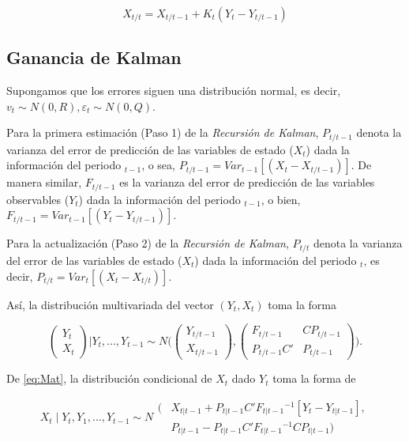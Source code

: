 \documentclass[
]{book}
\begin{document}
\begin{equation}
X_{t/t} = X_{t/t-1} + K_t (Y_t - Y_{t/t-1})
\label{eq:Xt1}
\end{equation}

\hypertarget{ganancia-de-kalman}{%
\subsection{Ganancia de Kalman}\label{ganancia-de-kalman}}

Supongamos que los errores siguen una distribución normal, es decir, \(v_t \sim N(0,R), \varepsilon_t \sim N(0,Q)\).

Para la primera estimación (Paso 1) de la \emph{Recursión de Kalman}, \(P_{t/t-1}\) denota la varianza del error de predicción de las variables de estado (\(X_t\)) dada la información del periodo \(_{t-1}\), o sea, \(P_{t/t-1} = Var_{t-1}[(X_t - X_{t/t-1})]\). De manera similar, \(F_{t/t-1}\) es la varianza del error de predicción de las variables observables (\(Y_t\)) dada la información del periodo \(_{t-1}\), o bien, \(F_{t/t-1} = Var_{t-1}[(Y_t - Y_{t/t-1})]\).

Para la actualización (Paso 2) de la \emph{Recursión de Kalman}, \(P_{t/t}\) denota la varianza del error de las variables de estado (\(X_t\)) dada la información del periodo \(_t\), es decir, \(P_{t/t} = Var_t[(X_t - X_{t/t})]\).

Así, la distribución multivariada del vector \((Y_t,X_t)\) toma la forma

\begin{equation}
\begin{pmatrix}
Y_t \\ X_t
\end{pmatrix}
\Bigg|
Y_t,...,Y_{t-1} \sim N
\Bigg(\begin{pmatrix}
Y_{t/t-1} \\ X_{t/t-1}
\end{pmatrix},
\begin{pmatrix}
F_{t/t-1} & C P_{t/t-1} \\
P_{t/t-1} C' & P_{t/t-1}
\end{pmatrix}\Bigg).
\label{eq:Mat}
\end{equation}

De \eqref{eq:Mat}, la distribución condicional de \(X_t\) dado \(Y_t\) toma la forma de

\begin{equation}
X_t \mid Y_t, Y_1, ... , Y_{t-1} \sim N
\begin{aligned}
( & X_{t|t-1} + P_{t|t-1} C' F_{t|t-1} {}^{-1} [Y_t - Y_{t|t-1}], \\ 
& P_{t|t-1} - P_{t|t-1} C' F_{t|t-1} {}^{-1} C P_{t|t-1} )
\end{aligned}
\label{eq:Xt2}
\end{equation}
\end{document}
